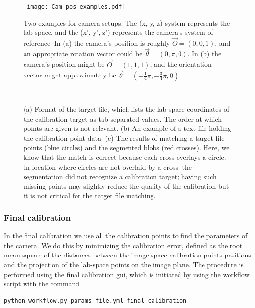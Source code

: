\documentclass[10pt,a4paper]{article}
\begin{document}
\vspace{.25cm}

\begin{figure}
	\centering
	\texttt{[image: Cam\_pos\_examples.pdf]}
	\caption{Two examples for camera setups. The (x, y, z) system represents the lab space, and the (x', y', z') represents the camera's system of reference. In (a) the camera's position is roughly $\vec{O} = (0,0,1)$, and an appropriate rotation vector could be $\vec{\theta} = (0,\pi,0)$. In (b) the camera's position might be $\vec{O} = (1,1,1)$, and the orientation vector might approximately be $\vec{\theta} = (-\frac{1}{4}\pi,-\frac{3}{4}\pi,0)$. \label{fig:cam_pos_example}}
\end{figure}






\begin{figure}[!ht]
	\centering
	\\
	\caption{(a) Format of the target file, which lists the lab-space coordinates of the calibration target as tab-separated values. The order at which points are given is not relevant. (b) An example of a text file holding the calibration point data. (c) The results of matching a target file points (blue circles) and the segmented blobs (red crosses). Here, we know that the match is correct because each cross overlays a circle. In location where circles are not overlaid by a cross, the segmentation did not recognize a calibration target; having such missing points may slightly reduce the quality of the calibration but it is not critical for the target file matching.}
\end{figure}



\subsubsection{Final calibration}

In the final calibration we use all the calibration points to find the parameters of the camera. We do this by minimizing the calibration error, defined as the root mean square of the distances between the image-space calibration points positions and the projection of the lab-space points on the image plane.
The procedure is performed using the final calibration gui, which is initiated by using the workflow script with the command
%
\begin{verbatim}
python workflow.py params_file.yml final_calibration
\end{verbatim}
%
\end{document}
